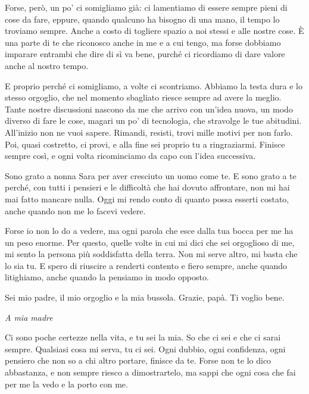 Forse, però, un po' ci somigliamo già: ci lamentiamo di essere sempre pieni di cose da fare, eppure, quando qualcuno ha bisogno di una mano, il tempo lo troviamo sempre. Anche a costo di togliere spazio a noi stessi e alle nostre cose. È una parte di te che riconosco anche in me e a cui tengo, ma forse dobbiamo imparare entrambi che dire di sì va bene, purché ci ricordiamo di dare valore anche al nostro tempo.\par

E proprio perché ci somigliamo, a volte ci scontriamo. Abbiamo la testa dura e lo stesso orgoglio, che nel momento sbagliato riesce sempre ad avere la meglio. Tante nostre discussioni nascono da me che arrivo con un'idea nuova, un modo diverso di fare le cose, magari un po' di tecnologia, che stravolge le tue abitudini. All'inizio non ne vuoi sapere. Rimandi, resisti, trovi mille motivi per non farlo. Poi, quasi costretto, ci provi, e alla fine sei proprio tu a ringraziarmi. Finisce sempre così, e ogni volta ricominciamo da capo con l'idea successiva.\par

Sono grato a nonna Sara per aver cresciuto un uomo come te. E sono grato a te perché, con tutti i pensieri e le difficoltà che hai dovuto affrontare, non mi hai mai fatto mancare nulla. Oggi mi rendo conto di quanto possa esserti costato, anche quando non me lo facevi vedere.\par

Forse io non lo do a vedere, ma ogni parola che esce dalla tua bocca per me ha un peso enorme. Per questo, quelle volte in cui mi dici che sei orgoglioso di me, mi sento la persona più soddisfatta della terra. Non mi serve altro, mi basta che lo sia tu. E spero di riuscire a renderti contento e fiero sempre, anche quando litighiamo, anche quando la pensiamo in modo opposto.\par

Sei mio padre, il mio orgoglio e la mia bussola. Grazie, papà. Ti voglio bene.\par

\vspace{5mm}
\textit{A mia madre}\par
\vspace{2mm}
Ci sono poche certezze nella vita, e tu sei la mia. So che ci sei e che ci sarai sempre. Qualsiasi cosa mi serva, tu ci sei. Ogni dubbio, ogni confidenza, ogni pensiero che non so a chi altro portare, finisce da te. Forse non te lo dico abbastanza, e non sempre riesco a dimostrartelo, ma sappi che ogni cosa che fai per me la vedo e la porto con me.\par

